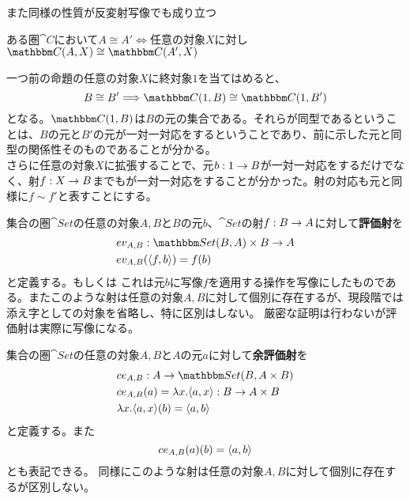   また同様の性質が反変射写像でも成り立つ
  \begin{prop}[同型射となる反変射写像]
    ある圏$\cat{C}$において$A\cong A'\iff$任意の対象$X$に対し$\arset{C}{A}{X}\cong\arset{C}{A'}{X}$
  \end{prop}

  一つ前の命題の任意の対象$X$に終対象$1$を当てはめると、\[B\cong B'\Longrightarrow \arset{C}{1}{B}\cong\arset{C}{1}{B'}\]となる。$\arset{C}{1}{B}$は$B$の元の集合である。それらが同型であるということは、$B$の元と$B'$の元が一対一対応をするということであり、前に示した元と同型の関係性そのものであることが分かる。\\
  さらに任意の対象$X$に拡張することで、元$b:1\rightarrow B$が一対一対応をするだけでなく、射$f:X\rightarrow B$までもが一対一対応をすることが分かった。射の対応も元と同様に$f\sim f'$と表すことにする。
  \begin{define}[評価射]
		集合の圏$\cat{Set}$の任意の対象$A,B$と$B$の元$b$、$\cat{Set}$の射$f:B\rightarrow A$に対して\textbf{評価射}を
		\begin{align*}
			\mor{&ev_{A,B}}{\arset{Set}{B}{A}\times B}{A}\\
			&ev_{A,B}(\tuple{f,b})=f(b)\\
		\end{align*}
		と定義する。もしくは
    これは元$b$に写像$f$を適用する操作を写像にしたものである。またこのような射は任意の対象$A,B$に対して個別に存在するが、現段階では添え字としての対象を省略し、特に区別はしない。
		厳密な証明は行わないが評価射は実際に写像になる。
	\end{define}

	\begin{define}[余評価射]
		集合の圏$\cat{Set}$の任意の対象$A,B$と$A$の元$a$に対して\textbf{余評価射}を
		\begin{align*}
			\mor{&ce_{A,B}}{A}{\arset{Set}{B}{A\times B}}\\
			&ce_{A,B}(a)=\lambda x.\tuple{a,x}\mor{}{B}{A\times B}\\
			&\lambda x.\tuple{a,x}(b)=\tuple{a,b}
		\end{align*}
		と定義する。また\[ce_{A,B}(a)(b)=\langle a,b\rangle\]とも表記できる。
    同様にこのような射は任意の対象$A,B$に対して個別に存在するが区別しない。
	\end{define}

